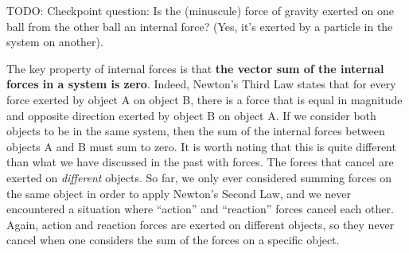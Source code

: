 TODO: Checkpoint question: Is the (minuscule) force of gravity exerted on one ball from the other ball an internal force? (Yes, it's exerted by a particle in the system on another).

The key property of internal forces is that \textbf{the vector sum of the internal forces in a system is zero}. Indeed, Newton's Third Law states that for every force exerted by object A on object B, there is a force that is equal in magnitude and opposite direction exerted by object B on object A. If we consider both objects to be in the same system, then the sum of the internal forces between objects A and B must sum to zero. It is worth noting that this is quite different than what we have discussed in the past with forces. The forces that cancel are exerted on \textit{different} objects. So far, we only ever considered summing forces on the same object in order to apply Newton's Second Law, and we never encountered a situation where ``action'' and ``reaction'' forces cancel each other. Again, action and reaction forces are exerted on different objects, so they never cancel when one considers the sum of the forces on a specific object.

